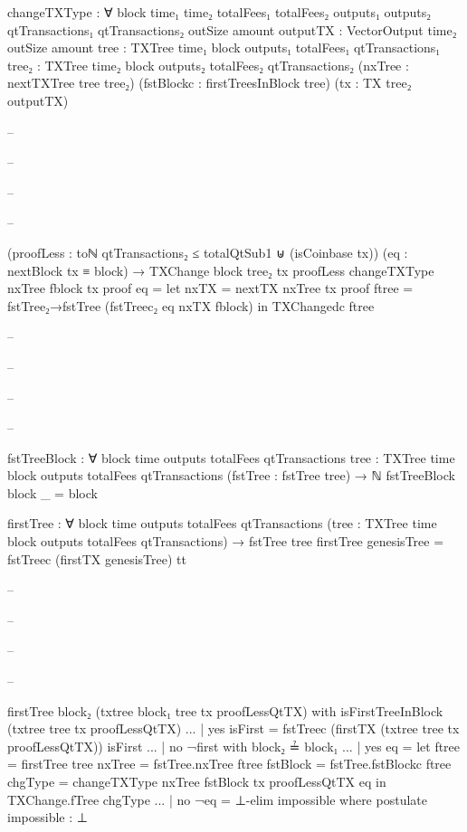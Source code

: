 \documentclass{beamer}
\begin{document}
{\begin{frame}
\begin{code}
      changeTXType : ∀
        {block time₁ time₂ totalFees₁ totalFees₂
          outputs₁ outputs₂ qtTransactions₁ qtTransactions₂
        outSize amount}
        {outputTX : VectorOutput time₂ outSize amount}
        {tree : TXTree time₁ block
          outputs₁ totalFees₁ qtTransactions₁}
        {tree₂ : TXTree time₂ block outputs₂
          totalFees₂ qtTransactions₂}
        (nxTree : nextTXTree tree tree₂)
        (fstBlockc : firstTreesInBlock tree)
        (tx : TX tree₂ outputTX)

-- \end{code}
-- \end{frame}
-- \begin{frame}
-- \begin{code}

        (proofLess :
          toℕ qtTransactions₂ ≤ totalQtSub1
          ⊎
          (isCoinbase tx))
        (eq : nextBlock tx ≡ block)
        → TXChange {block} tree₂ tx proofLess
      changeTXType nxTree fblock tx proof eq =
        let nxTX = nextTX nxTree tx proof
            ftree = fstTree₂→fstTree (fstTreec₂ eq nxTX fblock)
        in TXChangedc ftree

-- \end{code}
-- \end{frame}
-- \begin{frame}
-- \begin{code}


      fstTreeBlock : ∀
        {block time outputs totalFees qtTransactions}
        {tree : TXTree time block outputs totalFees qtTransactions}
        (fstTree : fstTree tree)
        → ℕ
      fstTreeBlock {block} _ = block

      firstTree : ∀
        {block time outputs totalFees qtTransactions}
        (tree : TXTree time block outputs totalFees qtTransactions)
        → fstTree tree
      firstTree genesisTree = fstTreec (firstTX genesisTree) tt

-- \end{code}
-- \end{frame}
-- \begin{frame}
-- \begin{code}

      firstTree {block₂} (txtree {block₁} tree tx proofLessQtTX)
        with isFirstTreeInBlock (txtree tree tx proofLessQtTX)
      ... | yes isFirst = fstTreec
        (firstTX (txtree tree tx proofLessQtTX)) isFirst
      ... | no ¬first with block₂ ≟ block₁
      ...   | yes eq = let ftree = firstTree tree
                           nxTree = fstTree.nxTree ftree
                           fstBlock = fstTree.fstBlockc ftree
                           chgType = changeTXType nxTree
                             fstBlock tx proofLessQtTX eq
                       in TXChange.fTree chgType
      ...   | no ¬eq = ⊥-elim impossible
                where postulate impossible : ⊥


\end{code}
\end{frame}}
\end{document}
